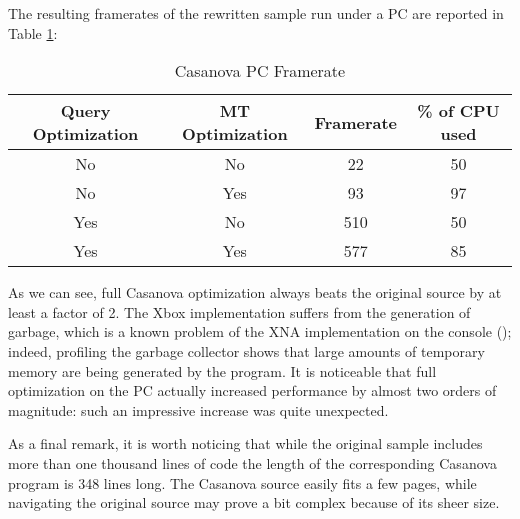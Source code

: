 The resulting framerates of the rewritten sample run under a PC are reported in Table \ref{table:pc_fps}:

\begin{table}[ht] 
\center
\begin{tabular}{|cccc|} 
\hline
Query Optimization & MT Optimization & Framerate & \% of CPU used \\ 
\hline
No & No & 22 & 50 \\
No & Yes & 93 & 97 \\
Yes & No & 510 & 50 \\
Yes & Yes & 577 & 85 \\
\hline
\end{tabular} 
\caption{Casanova PC Framerate}
\label{table:pc_fps}
\end{table}

As we can see, full Casanova optimization always beats the original source by at least a factor of 2. The Xbox implementation suffers from the generation of garbage, which is a known problem of the XNA implementation on the console (\cite{XBOX_GC}); indeed, profiling the garbage collector shows that large amounts of temporary memory are being generated by the program. It is noticeable that full optimization on the PC actually increased performance by almost two orders of magnitude: such an impressive increase was quite unexpected.


As a final remark, it is worth noticing that while the original sample includes more than one thousand lines of code the length of the corresponding Casanova program is 348 lines long. The Casanova source easily fits a few pages, while navigating the original source may prove a bit complex because of its sheer size.